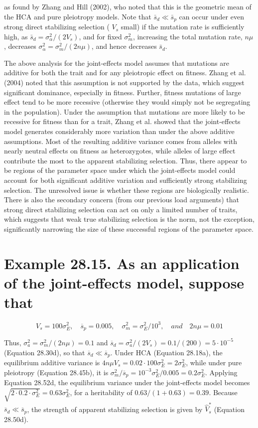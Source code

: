 \documentclass{article}
\begin{document}
as found by Zhang and Hill (2002), who noted that this is the geometric mean of the HCA and pure pleiotropy models. Note that  $ \bar{s}_d \ll \bar{s}_p $ can occur under even strong direct stabilizing selection ( $ V_s $ small) if the mutation rate is sufficiently high, as  $ \bar{s}_d = \sigma_\alpha^2/(2V_s) $, and for fixed  $ \sigma_m^2 $, increasing the total mutation rate,  $ n\mu $, decreases  $ \sigma_\alpha^2 = \sigma_m^2/(2n\mu) $, and hence decreases  $ \bar{s}_d $.

The above analysis for the joint-effects model assumes that mutations are additive for both the trait and for any pleiotropic effect on fitness. Zhang et al. (2004) noted that this assumption is not supported by the data, which suggest significant dominance, especially in fitness. Further, fitness mutations of large effect tend to be more recessive (otherwise they would simply not be segregating in the population). Under the assumption that mutations are more likely to be recessive for fitness than for a trait, Zhang et al. showed that the joint-effects model generates considerably more variation than under the above additive assumptions. Most of the resulting additive variance comes from alleles with nearly neutral effects on fitness as heterozygotes, while alleles of large effect contribute the most to the apparent stabilizing selection. Thus, there appear to be regions of the parameter space under which the joint-effects model could account for both significant additive variation and sufficiently strong stabilizing selection. The unresolved issue is whether these regions are biologically realistic. There is also the secondary concern (from our previous load arguments) that strong direct stabilizing selection can act on only a limited number of traits, which suggests that weak true stabilizing selection is the norm, not the exception, significantly narrowing the size of these successful regions of the parameter space.

\section{Example 28.15. As an application of the joint-effects model, suppose that}
\begin{equation}
V_{s}=100\sigma_{E}^{2},\quad\overline{s}_{p}=0.005,\quad\sigma_{m}^{2}=\sigma_{E}^{2}/10^{3},\quad and\quad2n\mu=0.01
\end{equation}

Thus,  $ \sigma_a^2 = \sigma_m^2 / (2n\mu) = 0.1 $ and  $ \overline{s}_d = \sigma_a^2 / (2V_s) = 0.1 / (200) = 5 \cdot 10^{-5} $ (Equation 28.30d), so that  $ \overline{s}_d \ll \overline{s}_p $. Under HCA (Equation 28.18a), the equilibrium additive variance is  $ 4n\mu V_s = 0.02 \cdot 100 \sigma_E^2 = 2 \sigma_E^2 $, while under pure pleiotropy (Equation 28.45b), it is  $ \sigma_m^2 / \overline{s}_p = 10^{-3} \sigma_E^2 / 0.005 = 0.2 \sigma_E^2 $. Applying Equation 28.52d, the equilibrium variance under the joint-effects model becomes  $ \sqrt{2 \cdot 0.2 \cdot \sigma_E^2} = 0.63 \sigma_E^2 $, for a heritability of  $ 0.63 / (1 + 0.63) = 0.39 $. Because  $ \overline{s}_d \ll \overline{s}_p $, the strength of apparent stabilizing selection is given by  $ \widehat{V}_s^* $ (Equation 28.50d).
\end{document}
